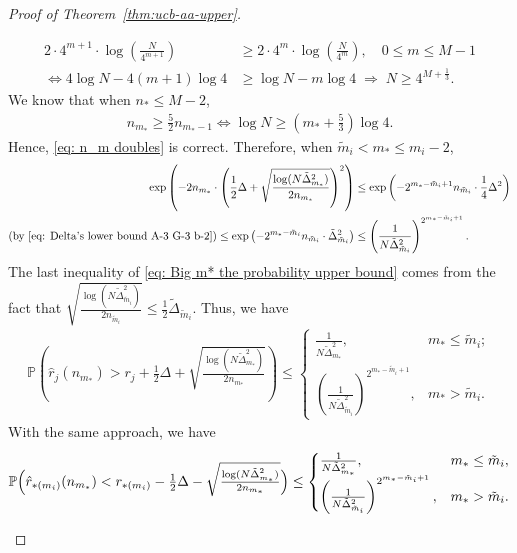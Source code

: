 \documentclass[11pt]{article}
\begin{document}
\begin{proof}[Proof of Theorem~\ref{thm:ucb-aa-upper}]
\begin{itemize}
\begin{align*}
    2\cdot 4^{m+1}\cdot \log\left(\frac{N}{4^{m+1}}\right)&\geq 2\cdot 4^{m}\cdot \log\left(\frac{N}{4^{m}}\right),\quad 0\leq m\leq M-1\\
    \iff 4\log N -4(m+1)\log 4&\geq \log N - m\log 4 \; \Rightarrow\; N\geq 4^{M+\frac{1}{3}}.
\end{align*}
We know that when $n_*\leq M-2$,
\begin{align*}
    n_{m_*}\geq \frac{5}{2}n_{m_*-1}\iff  \log N \geq \left(m_*+\frac{5}{3}\right)\log 4.
\end{align*}
Hence, \eqref{eq: n_m doubles} is correct. Therefore, when $\tilde{m}_i<m_*\leq m_i-2$, 
\begin{align}
    \exp \left(-2n_{m_*}\cdot \left(\frac{1}{2}\Delta +\sqrt{\frac{\log(N \tilde{\Delta}_{m_*}^2)}{2n_{m_*}}}\right)^2\right)&\leq \exp \left(-2^{m_*-\tilde{m}_i+1}n_{\tilde{m}_i}\cdot \frac{1}{4}\Delta ^2\right)\notag \\
    (\text{by } \eqref{eq: Delta's lower bound A-3 G-3 b-2})
    \leq \exp \left(-2^{m_*-\tilde{m}_i}n_{\tilde{m}_i}\cdot \tilde{\Delta}_{\tilde{m}_i}^2\right)&\leq \left(\frac{1}{N\tilde{\Delta}_{\tilde{m}_i}^2}\right)^{2^{m_*-\tilde{m}_i+1}}.
    \label{eq: Big m* the probability upper bound}
\end{align}
The last inequality of \eqref{eq: Big m* the probability upper bound} comes from the fact that $\sqrt{\frac{\log(N \tilde{\Delta}_{\tilde{m}_i}^2)}{2n_{\tilde{m}_i}}}\leq \frac{1}{2}\tilde{\Delta}_{\tilde{m}_i}$. Thus, we have
\begin{align}
\!\!\!\!\!\!\!\!\!\!\!\!\mathbb{P}\left(\hat{r}_j(n_{m_*}) > r_j +\frac{1}{2}\Delta +\sqrt{\frac{\log(N \tilde{\Delta}_{m_*}^2)}{2n_{m_*}}}\right)\leq 
\begin{cases}
    \frac{1}{N\tilde{\Delta}_{m_*}^2}, & m_* \leq \tilde{m}_i;\\
    \left(\frac{1}{N\tilde{\Delta}_{\tilde{m}_i}^2}\right)^{2^{m_*-\tilde{m}_i+1}}, & m_*>\tilde{m}_i.
\end{cases}
\label{eq: A-3 G-3 b2 concentration bound 1}
\end{align}
With the same approach, we have 
\begin{align}
\mathbb{P}\Bigl(\hat{r}_{*(m_i)}(n_{m_*}) < r_{*(m_i)} - \tfrac{1}{2}\Delta - \sqrt{\tfrac{\log(N\tilde{\Delta}_{m_*}^2)}{2n_{m_*}}}\Bigr)
\le
\begin{cases}
    \frac{1}{N\tilde{\Delta}_{m_*}^2}, & m_* \le \tilde{m}_i,\\
    \left(\frac{1}{N\tilde{\Delta}_{\tilde{m}_i}^2}\right)^{2^{m_* - \tilde{m}_i + 1}}, & m_* > \tilde{m}_i.

\end{cases}
\end{align}
\end{itemize}
\end{proof}
\end{document}
